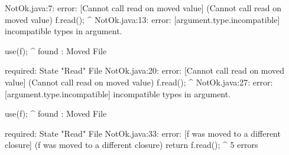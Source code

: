 \lstset{language=,caption=Our tool's output}
\begin{code}
NotOk.java:7: error: [Cannot call read on moved value] (Cannot call read on moved value)
    f.read();
          ^
NotOk.java:13: error: [argument.type.incompatible] incompatible types in argument.

    use(f);
        ^
  found   : Moved File

  required: State "Read" File
NotOk.java:20: error: [Cannot call read on moved value] (Cannot call read on moved value)
    f.read();
          ^
NotOk.java:27: error: [argument.type.incompatible] incompatible types in argument.

    use(f);
        ^
  found   : Moved File

  required: State "Read" File
NotOk.java:33: error: [f was moved to a different closure] (f was moved to a different closure)
      return f.read();
             ^
5 errors
\end{code}

